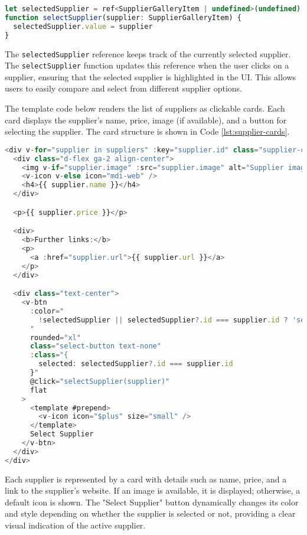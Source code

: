 \begin{lstlisting}[language=JavaScript, caption={Selecting a Supplier (\texttt{SupplierGallery.vue})},
  firstnumber=36,label={lst:select-supplier-function}]
let selectedSupplier = ref<SupplierGalleryItem | undefined>(undefined)
function selectSupplier(supplier: SupplierGalleryItem) {
  selectedSupplier.value = supplier
}
\end{lstlisting}

The \texttt{selectedSupplier} reference keeps track of the currently selected supplier. The \texttt{selectSupplier}
function updates this reference when the user clicks on a supplier, ensuring that the selected supplier is highlighted
in the UI. This allows users to easily compare and select from different supplier options.

The template code below renders the list of suppliers as clickable cards. Each card displays the supplier’s name, price,
image (if available), and a button for selecting the supplier. The card structure is shown in Code
\ref{lst:supplier-cards}.

\begin{lstlisting}[language=JavaScript, caption={Rendering the Supplier Cards (\texttt{SupplierGallery.vue})},
  firstnumber=44,label={lst:supplier-cards}]
<div v-for="supplier in suppliers" :key="supplier.id" class="supplier-card">
  <div class="d-flex ga-2 align-center">
    <img v-if="supplier.image" :src="supplier.image" alt="Supplier image" />
    <v-icon v-else icon="mdi-web" />
    <h4>{{ supplier.name }}</h4>
  </div>

  <p>{{ supplier.price }}</p>

  <div>
    <b>Further links:</b>
    <p>
      <a :href="supplier.url">{{ supplier.url }}</a>
    </p>
  </div>

  <div class="text-center">
    <v-btn
      :color="
        !selectedSupplier || selectedSupplier?.id === supplier.id ? 'secondary' : '#d0d0d2'
      "
      rounded="xl"
      class="select-button text-none"
      :class="{
        selected: selectedSupplier?.id === supplier.id
      }"
      @click="selectSupplier(supplier)"
      flat
    >
      <template #prepend>
        <v-icon icon="$plus" size="small" />
      </template>
      Select Supplier
    </v-btn>
  </div>
</div>
\end{lstlisting}

Each supplier is represented by a card with details such as name, price, and a link to the supplier’s website. If an
image is available, it is displayed; otherwise, a default icon is shown. The "Select Supplier" button dynamically
changes its color and style depending on whether the supplier is selected or not, providing a clear visual indication
of the active supplier.